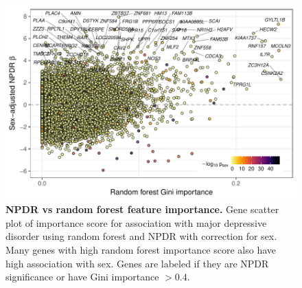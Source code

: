 \documentclass[10pt]{article}
\begin{document}
\begin{figure}[!tpb]%
\centerline{\includegraphics[]{../figs/npdr_rf_mdd.pdf}}
\caption{{\bf NPDR vs random forest feature importance.}
Gene scatter plot of importance score for association with major depressive disorder using random forest and NPDR with correction for sex. Many genes with high random forest importance score also have high association with sex. Genes are labeled if they are NPDR significance or have Gini importance $>0.4$.}
\label{fig:npdr_rf_mdd}
\end{figure}



\end{document}

